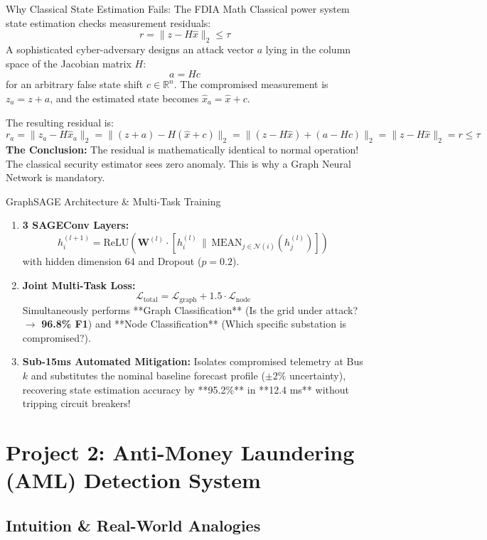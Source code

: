 \documentclass[11pt,a4paper]{article}
\begin{document}
\begin{techbox}{Why Classical State Estimation Fails: The FDIA Math}
Classical power system state estimation checks measurement residuals:
$$r = \|z - H\hat{x}\|_2 \le \tau$$
A sophisticated cyber-adversary designs an attack vector $a$ lying in the column space of the Jacobian matrix $H$:
$$a = Hc$$
for an arbitrary false state shift $c \in \mathbb{R}^n$. The compromised measurement is $z_a = z + a$, and the estimated state becomes $\hat{x}_a = \hat{x} + c$.

The resulting residual is:
$$r_a = \|z_a - H\hat{x}_a\|_2 = \|(z + a) - H(\hat{x} + c)\|_2 = \|(z - H\hat{x}) + (a - Hc)\|_2 = \|z - H\hat{x}\|_2 = r \le \tau$$
\textbf{The Conclusion:} The residual is mathematically identical to normal operation! The classical security estimator sees zero anomaly. This is why a Graph Neural Network is mandatory.
\end{techbox}

\begin{techbox}{GraphSAGE Architecture \& Multi-Task Training}
\begin{enumerate}
    \item \textbf{3 SAGEConv Layers:}
    $$h_i^{(l+1)} = \text{ReLU} \left( \mathbf{W}^{(l)} \cdot \left[ h_i^{(l)} \,\|\, \text{MEAN}_{j \in \mathcal{N}(i)} (h_j^{(l)}) \right] \right)$$
    with hidden dimension 64 and Dropout ($p=0.2$).
    \item \textbf{Joint Multi-Task Loss:}
    $$\mathcal{L}_{\text{total}} = \mathcal{L}_{\text{graph}} + 1.5 \cdot \mathcal{L}_{\text{node}}$$
    Simultaneously performs **Graph Classification** (Is the grid under attack? $\to$ \textbf{96.8\% F1}) and **Node Classification** (Which specific substation is compromised?).
    \item \textbf{Sub-15ms Automated Mitigation:} Isolates compromised telemetry at Bus $k$ and substitutes the nominal baseline forecast profile ($\pm 2\%$ uncertainty), recovering state estimation accuracy by **95.2\%** in **12.4 ms** without tripping circuit breakers!
\end{enumerate}
\end{techbox}

\section{Project 2: Anti-Money Laundering (AML) Detection System}

\subsection{Intuition \& Real-World Analogies}
\end{document}
